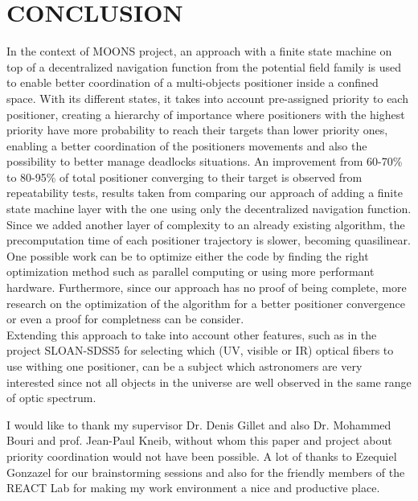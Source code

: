 \documentclass[]{spie}  %
\begin{document}
	\section{CONCLUSION}
	\label{CONCLUSION}
	In the context of MOONS project, an approach with a finite state machine on top of a decentralized navigation function from the potential field family is used to enable better coordination of a multi-objects positioner inside a confined space. With its different states, it takes into account pre-assigned priority to each positioner, creating a hierarchy of importance where positioners with the highest priority have more probability to reach their targets than lower priority ones, enabling a better coordination of the positioners movements and also the possibility to better manage deadlocks situations. An improvement from  60-70\% to 80-95\% of total positioner converging to their target is observed from repeatability tests, results taken from comparing our approach of adding a finite state machine layer with the one using only the decentralized navigation function.\\
	Since we added another layer of complexity to an already existing algorithm, the precomputation time of each positioner trajectory is slower, becoming quasilinear. One possible work can be to optimize either the code by finding the right optimization method such as parallel computing or using more performant hardware. Furthermore, since our approach has no proof of being complete, more research on the optimization of the algorithm for a better positioner convergence or even a proof for completness can be consider.\\
	Extending this approach to take into account other features, such as in the project SLOAN-SDSS5 for selecting which (UV, visible or IR) optical fibers to use withing one positioner, can be a subject which astronomers are very interested since not all objects in the universe are well observed in the same range of optic spectrum.
	
	\acknowledgments %
	
	I would like to thank my supervisor Dr. Denis Gillet and also Dr. Mohammed Bouri and prof. Jean-Paul Kneib, without whom this paper and project about priority coordination would not have been possible. A lot of thanks to Ezequiel Gonzazel for our brainstorming sessions and also for the friendly members of the REACT Lab for making my work environment a nice and productive place. 
	

\end{document}
